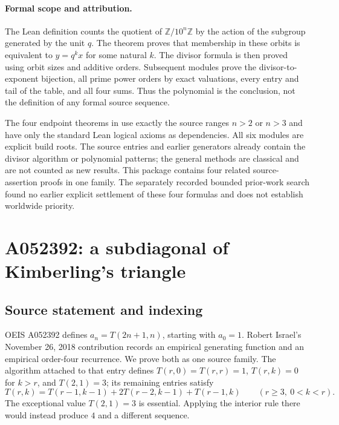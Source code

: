\documentclass[11pt]{article}
\begin{document}
\paragraph{Formal scope and attribution.}
The Lean definition counts the quotient of $\mathbb Z/10^n\mathbb Z$
by the action of the subgroup generated by the unit $q$.
The theorem  proves that membership in these
orbits is equivalent to $y=q^kx$ for some natural $k$.
The divisor formula is then proved using orbit sizes and additive
orders. Subsequent modules prove the divisor-to-exponent bijection,
all prime power orders by exact valuations, every entry and tail of
the table, and all four sums. Thus the polynomial is the conclusion,
not the definition of any formal source sequence.

The four endpoint theorems in  use exactly the
source ranges $n>2$ or $n>3$ and have only the standard Lean logical
axioms as dependencies. All six modules are explicit build roots.
The source entries and earlier generators already contain the
divisor algorithm or polynomial patterns; the general methods are
classical and are not counted as new results. This package contains
four related source-assertion proofs in one family. The separately
recorded bounded prior-work search found no earlier explicit
settlement of these four formulas and does not establish worldwide
priority.


\section{A052392: a subdiagonal of Kimberling's triangle}
\label{sec:a052392}

\subsection{Source statement and indexing}

OEIS A052392 \cite{oeis052392} defines $a_n=T(2n+1,n)$, starting with $a_0=1$.
Robert Israel's November 26, 2018 contribution records an empirical
generating function and an empirical order-four recurrence. We prove both
as one source family. The algorithm attached to that entry defines
$T(r,0)=T(r,r)=1$, $T(r,k)=0$ for $k>r$, and $T(2,1)=3$; its remaining
entries satisfy
\begin{equation}\label{eq:a052392-triangle}
 T(r,k)=T(r-1,k-1)+2T(r-2,k-1)+T(r-1,k)
 \qquad(r\ge3,\ 0<k<r).
\end{equation}
The exceptional value $T(2,1)=3$ is essential. Applying the interior rule
there would instead produce $4$ and a different sequence.
\end{document}
